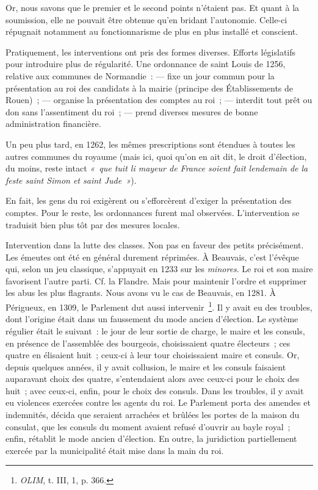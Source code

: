 \documentclass[french,twoside]{book} %
\begin{document}
\noindent Or, nous savons que le premier et le second points n’étaient pas. Et quant à la soumission, elle ne pouvait être obtenue qu’en bridant l’autonomie. Celle-ci répugnait notamment au fonctionnarisme de plus en plus installé et conscient.\par
Pratiquement, les interventions ont pris des formes diverses. Efforts législatifs pour introduire plus de régularité. Une ordonnance de saint Louis de 1256, relative aux communes de Normandie : —  
\label{p80} fixe un jour commun pour la présentation au roi des candidats à la mairie (principe des Établissements de Rouen) ; — organise la présentation des comptes au roi ; — interdit tout prêt ou don sans l’assentiment du roi ; — prend diverses mesures de bonne administration financière.\par
Un peu plus tard, en 1262, les mêmes prescriptions sont étendues à toutes les autres communes du royaume (mais ici, quoi qu’on en ait dit, le droit d’élection, du moins, reste intact \emph{« que tuit li mayeur de France soient fait lendemain de la feste saint Simon et saint Jude »}).\par
En fait, les gens du roi exigèrent ou s’efforcèrent d’exiger la présentation des comptes. Pour le reste, les ordonnances furent mal observées. L’intervention se traduisit bien plus tôt par des mesures locales.\par
Intervention dans la lutte des classes. Non pas en faveur des petits précisément. Les émeutes ont été en général durement répri­mées. À Beauvais, c’est l’évêque qui, selon un jeu classique, s’appuyait en 1233 sur les {\itshape minores}. Le roi et son maire favorisent l’autre parti. Cf. la Flandre. Mais pour maintenir l’ordre et suppri­mer les abus les plus flagrants. Nous avons vu le cas de Beauvais, en 1281. À Périgueux, en 1309, le Parlement dut aussi intervenir \footnote{{\itshape OLIM}, t. III, 1, p. 366.}. Il y avait eu des troubles, dont l’origine était dans un faussement du mode ancien d’élection. Le système régulier était le suivant : le jour de leur sortie de charge, le maire et les consuls, en présence de l’assemblée des bourgeois, choisissaient quatre électeurs ; ces quatre en élisaient huit ; ceux-ci à leur tour choisissaient maire et consuls. Or, depuis quelques années, il y avait collusion, le maire et les consuls faisaient auparavant choix des quatre, s’entendaient alors avec ceux-ci pour le choix des huit ; avec ceux-ci, enfin, pour le choix des consuls. Dans les troubles, il y avait eu violences exercées contre les agents du roi. Le Parlement porta des amendes et indemnités, décida que seraient arrachées et brûlées les portes de la maison du consulat, que les consuls du moment avaient refusé d’ouvrir au bayle royal ; enfin, rétablit le mode ancien d’élection. En outre, la juridiction partiellement exercée par la municipalité était mise dans la main du roi.\par
\end{document}
